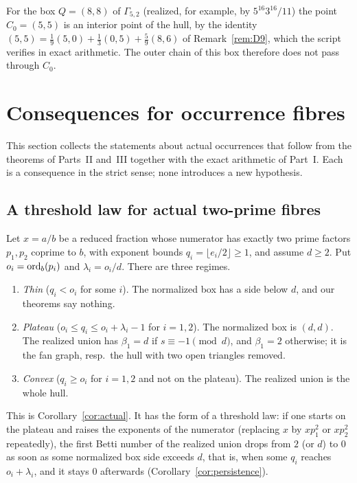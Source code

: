 \begin{remark}\label{rem:ex-d9}
For the box $Q=(8,8)$ of $\Gamma_{5,2}$ (realized, for example, by $5^{16}3^{16}/11$) the point $C_0=(5,5)$ is an interior point of the hull, by the identity $(5,5)=\tfrac19(5,0)+\tfrac13(0,5)+\tfrac59(8,6)$ of Remark~\ref{rem:D9}, which the script verifies in exact arithmetic. The outer chain of this box therefore does not pass through $C_0$.
\end{remark}

\section{Consequences for occurrence fibres}\label{sec:consequences}

This section collects the statements about actual occurrences that follow from the theorems of Parts~II and~III together with the exact arithmetic of Part~I. Each is a consequence in the strict sense; none introduces a new hypothesis.

\subsection{A threshold law for actual two-prime fibres}

Let $x=a/b$ be a reduced fraction whose numerator has exactly two prime factors $p_1,p_2$ coprime to $b$, with exponent bounds $q_i=\lfloor e_i/2\rfloor\ge1$, and assume $d\ge2$. Put $o_i=\operatorname{ord}_b(p_i)$ and $\lambda_i=o_i/d$. There are three regimes.

\begin{enumerate}
\item \emph{Thin} ($q_i<o_i$ for some $i$). The normalized box has a side below $d$, and our theorems say nothing.
\item \emph{Plateau} ($o_i\le q_i\le o_i+\lambda_i-1$ for $i=1,2$). The normalized box is $(d,d)$. The realized union has $\beta_1=d$ if $s\equiv-1\pmod d$, and $\beta_1=2$ otherwise; it is the fan graph, resp.\ the hull with two open triangles removed.
\item \emph{Convex} ($q_i\ge o_i$ for $i=1,2$ and not on the plateau). The realized union is the whole hull.
\end{enumerate}

This is Corollary~\ref{cor:actual}. It has the form of a threshold law: if one starts on the plateau and raises the exponents of the numerator (replacing $x$ by $xp_1^2$ or $xp_2^2$ repeatedly), the first Betti number of the realized union drops from $2$ (or $d$) to $0$ as soon as some normalized box side exceeds $d$, that is, when some $q_i$ reaches $o_i+\lambda_i$, and it stays $0$ afterwards (Corollary~\ref{cor:persistence}).

